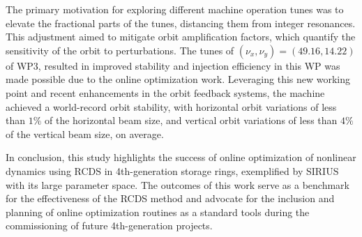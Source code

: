 The primary motivation for exploring different machine operation tunes was to elevate the fractional parts of the tunes, distancing them from integer resonances. This adjustment aimed to mitigate orbit amplification factors, which quantify the sensitivity of the orbit to perturbations. The tunes of $(\nu_x, \nu_y) = (49.16, 14.22)$ of WP3, resulted in improved stability and injection efficiency in this WP was made possible due to the online optimization work. Leveraging this new working point and recent enhancements in the orbit feedback systems, the machine achieved a world-record orbit stability, with horizontal orbit variations  of less than $1\%$ of the horizontal beam size, and vertical orbit variations of less than $4\%$ of the vertical beam size, on average.

In conclusion, this study highlights the success of online optimization of nonlinear dynamics using RCDS in 4th-generation storage rings, exemplified by SIRIUS with its large parameter space. The outcomes of this work serve as a benchmark for the effectiveness of the RCDS method and advocate for the inclusion and planning of online optimization routines as a standard tools during the commissioning of future 4th-generation projects.
